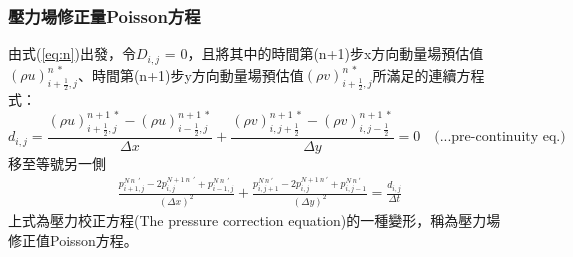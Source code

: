 \documentclass[12pt]{article}
\begin{document}
\subsubsection{壓力場修正量Poisson方程}
由式(\eqref{eq:n})出發，令$D_{i,j}$ = 0，且將其中的時間第(n+1)步x方向動量場預估值$(\rho u)_{i+\frac{1}{2},j}^{n\ *}$、時間第(n+1)步y方向動量場預估值$(\rho v)_{i+\frac{1}{2},j}^{n\ *}$所滿足的連續方程式：$$d_{i,j} = \frac{(\rho u)_{i+\frac{1}{2},j}^{n+1\ *} - (\rho u)_{i-\frac{1}{2},j}^{n+1\ *}}{\Delta x} + \frac{(\rho v)_{i,j+\frac{1}{2}}^{n+1\ *} - (\rho v)_{i,j-\frac{1}{2}}^{n+1\ *}}{\Delta y} = 0 \quad \text{(...pre-continuity eq.)}$$移至等號另一側
\begin{equation}\begin{split}
    \frac{p_{i+1,j}^{N\ n\ \ \prime}-2p_{i,j}^{N+1\ n\ \ \prime}+p_{i-1,j}^{N\ n\ \ \prime}}{(\Delta x)^{2}} + \frac{p_{i,j+1}^{N\ n\ \prime}-2p_{i,j}^{N+1\ n\ \prime}+p_{i,j-1}^{N\ n\ \prime}}{(\Delta y)^{2}} = \frac{d_{i,j}}{\Delta t}
\end{split}\end{equation}
\noindent 上式為壓力校正方程(The pressure correction equation)的一種變形，稱為壓力場修正值Poisson方程。
\end{document}
